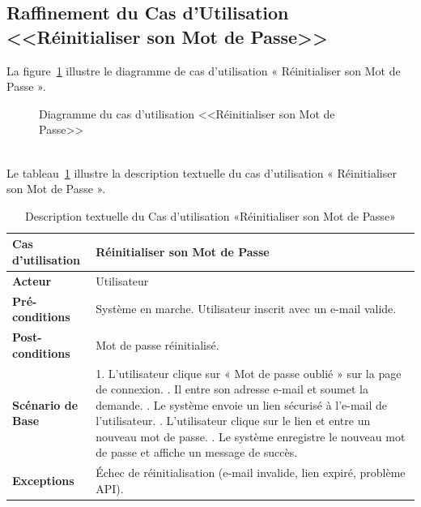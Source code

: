 \subsection{Raffinement du Cas d'Utilisation <<Réinitialiser son Mot de Passe>>}
La figure~\ref{fig:usecase_reset_password} illustre le diagramme de cas d'utilisation « Réinitialiser son Mot de Passe ».
\begin{figure}[h]
     \centering
     \caption{Diagramme du cas d'utilisation <<Réinitialiser son Mot de Passe>>}
     \label{fig:usecase_reset_password}
\end{figure}\\
Le tableau~\ref{tab:reset_password} illustre la description textuelle du cas d’utilisation « Réinitialiser son Mot de Passe ».
\newpage
\begin{table}[!ht]
\centering
\caption{Description textuelle du Cas d’utilisation «Réinitialiser son Mot de Passe»}
\label{tab:reset_password}
\renewcommand{\arraystretch}{1.2}
\begin{tabular}{|p{4.2cm}|p{11cm}|}
\hline
\textbf{Cas d'utilisation} & Réinitialiser son Mot de Passe \\
\hline
\textbf{Acteur} & Utilisateur \\
\hline
\textbf{Pré-conditions} & Système en marche. \newline Utilisateur inscrit avec un e-mail valide. \\
\hline
\textbf{Post-conditions} & Mot de passe réinitialisé. \\
\hline
\textbf{Scénario de Base} & 
1. L’utilisateur clique sur « Mot de passe oublié » sur la page de connexion. \newline
2. Il entre son adresse e-mail et soumet la demande. \newline
3. Le système envoie un lien sécurisé à l’e-mail de l’utilisateur. \newline
4. L’utilisateur clique sur le lien et entre un nouveau mot de passe. \newline
5. Le système enregistre le nouveau mot de passe et affiche un message de succès. \\
\hline
\textbf{Exceptions} & 
Échec de réinitialisation (e-mail invalide, lien expiré, problème API). \\
\hline
\end{tabular}
\end{table}

